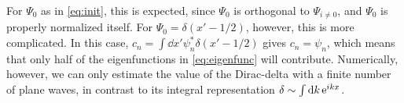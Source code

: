 For $\Psi_0$ as in \cref{eq:init}, this is expected, since $\Psi_0$ is orthogonal to $\Psi_{i\ne0}$, and $\Psi_0 $ is properly normalized itself. For $\Psi_0 = \delta(x'-1/2)$, however, this is more complicated. 
In this case, $c_n = \int\dd{x'}\psi_n^*\delta(x'-1/2)$
gives $c_n = \psi_n$, which means that only half of the eigenfunctions in \cref{eq:eigenfunc} will contribute. Numerically, however, we can only estimate the value of the Dirac-delta with a finite number of plane waves, in contrast to its integral representation $\delta \sim \int\dd{k}\mathrm{e}^{ikx}$.


